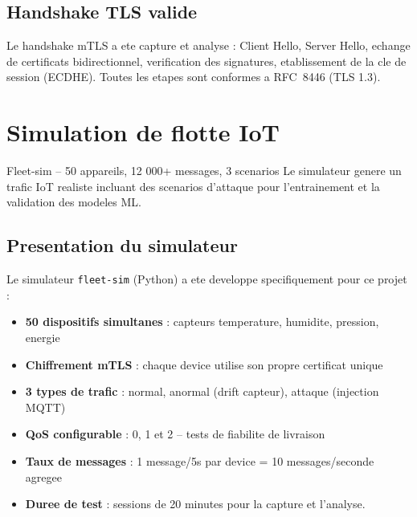 \documentclass[a4paper,11pt]{article}
\begin{document}
\subsection{Handshake TLS valide}

Le handshake mTLS a ete capture et analyse : Client Hello, Server Hello,
echange de certificats bidirectionnel, verification des signatures,
etablissement de la cle de session (ECDHE). Toutes les etapes sont conformes
a RFC~8446 (TLS 1.3).

\section{Simulation de flotte IoT}

\begin{resultbox}{Fleet-sim -- 50 appareils, 12 000+ messages, 3 scenarios}
  Le simulateur genere un trafic IoT realiste incluant des scenarios d'attaque
  pour l'entrainement et la validation des modeles ML.
\end{resultbox}

\subsection{Presentation du simulateur}

Le simulateur \texttt{fleet-sim} (Python) a ete developpe specifiquement pour ce projet :

\begin{itemize}[leftmargin=1.5em]
  \item \textbf{50 dispositifs simultanes} : capteurs temperature, humidite, pression, energie 
  \item \textbf{Chiffrement mTLS} : chaque device utilise son propre certificat unique 
  \item \textbf{3 types de trafic} : normal, anormal (drift capteur), attaque (injection MQTT) 
  \item \textbf{QoS configurable} : 0, 1 et 2 -- tests de fiabilite de livraison 
  \item \textbf{Taux de messages} : 1 message/5s par device = 10 messages/seconde agregee 
  \item \textbf{Duree de test} : sessions de 20 minutes pour la capture et l'analyse.
\end{itemize}
\end{document}
